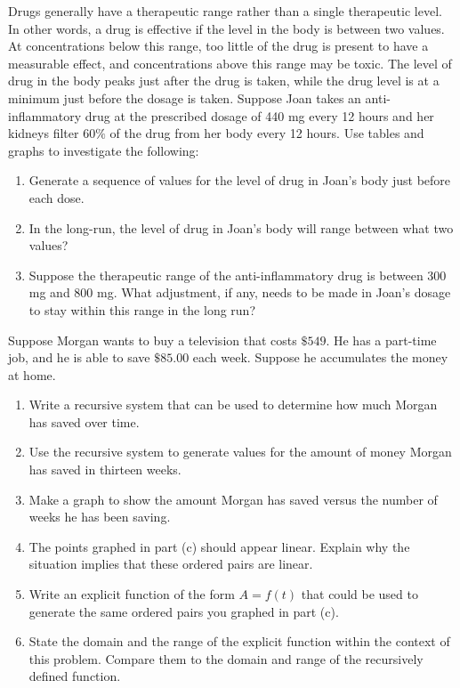 \documentclass[10pt,]{book}
\theoremstyle{ptxdefinitionnotitle}
\theoremstyle{ptxdefinitiontitle}
\theoremstyle{ptxdefinitionnotitle}
\theoremstyle{ptxdefinitiontitle}
\theoremstyle{ptxdefinitionnotitle}
\theoremstyle{ptxdefinitiontitle}
\numberwithin{equation}{section}
\begin{document}
\begin{divisionexercise}{7}\hypertarget{exercise-9}{}
\hypertarget{p-27}{}%
Drugs generally have a therapeutic range rather than a single therapeutic level.  In other words, a drug is effective if the level in the body is between two values.  At concentrations below this range, too little of the drug is present to have a measurable effect, and concentrations above this range may be toxic.  The level of drug in the body peaks just after the drug is taken, while the drug level is at a minimum just before the dosage is taken.  Suppose Joan takes an anti-inflammatory drug at the prescribed dosage of 440 mg every 12 hours and her kidneys filter \(60\%\) of the drug from her body every 12 hours.  Use tables and graphs to investigate the following: \leavevmode%
\begin{enumerate}[label=(\alph*)]
\item\hypertarget{li-31}{}Generate a sequence of values for the level of drug in Joan’s body just before each dose.%
\item\hypertarget{li-32}{}In the long-run, the level of drug in Joan’s body will range  between what two values?%
\item\hypertarget{li-33}{}Suppose the therapeutic range of the anti-inflammatory drug is between 300 mg and 800 mg.  What adjustment, if any, needs to be made in Joan’s dosage to stay within this range in the long run?%
\end{enumerate}
%
\end{divisionexercise}%
\begin{divisionexercise}{8}\hypertarget{exercise-10}{}
\hypertarget{p-28}{}%
Suppose Morgan  wants to buy a television that costs \(\$549\).  He has a part-time job, and he is able to save \(\$85.00\) each week.  Suppose he accumulates the money at home. \leavevmode%
\begin{enumerate}[label=(\alph*)]
\item\hypertarget{li-34}{}Write a recursive system that can be used to determine how much Morgan has saved over time.%
\item\hypertarget{li-35}{}Use the recursive system to generate values for the amount of money Morgan has saved in thirteen weeks.%
\item\hypertarget{li-36}{}Make a graph to show the amount Morgan has saved versus the number of weeks he has been saving.%
\item\hypertarget{li-37}{}The points graphed in part (c) should appear linear.  Explain why the situation implies that these ordered pairs are linear.%
\item\hypertarget{li-38}{}Write an explicit function of the form \(A=f(t)\) that could be used to generate the same ordered pairs you graphed in part (c).%
\item\hypertarget{li-39}{}State the domain and the range of the explicit function within the context of this problem.  Compare them to the domain and range of the recursively defined function.%
\end{enumerate}
%
\end{divisionexercise}%
\end{document}
